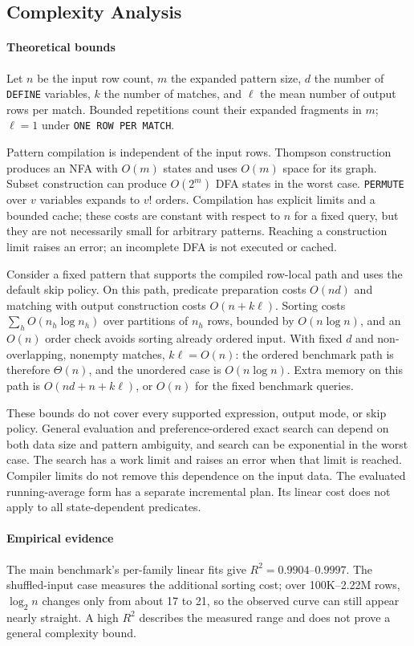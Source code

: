 \documentclass[preprint,12pt,times,a4paper]{elsarticle}
\begin{document}
\FloatBarrier
\subsection{Complexity Analysis}

\paragraph{Theoretical bounds}
Let $n$ be the input row count, $m$ the expanded pattern size, $d$ the number
of \texttt{DEFINE} variables, $k$ the number of matches, and $\ell$ the mean
number of output rows per match. Bounded repetitions count their expanded
fragments in $m$; $\ell=1$ under \texttt{ONE ROW PER MATCH}.

Pattern compilation is independent of the input rows. Thompson construction
produces an NFA with $O(m)$ states and uses $O(m)$ space for its graph.
Subset construction can produce
$O(2^m)$ DFA states in the worst case. \texttt{PERMUTE} over $v$ variables
expands to $v!$ orders. Compilation has explicit limits and a bounded cache;
these costs are constant with respect to $n$ for a fixed query, but they are
not necessarily small for arbitrary patterns. Reaching a construction limit
raises an error; an incomplete DFA is not executed or cached.

Consider a fixed pattern that supports the compiled row-local path and uses
the default skip policy. On this path,
predicate preparation costs $O(nd)$ and matching with output construction costs
$O(n+k\ell)$. Sorting costs $\sum_h O(n_h\log n_h)$ over partitions of $n_h$
rows, bounded by $O(n\log n)$, and an $O(n)$ order check avoids sorting already
ordered input. With fixed $d$ and non-overlapping, nonempty matches,
$k\ell=O(n)$: the ordered benchmark path is therefore $\Theta(n)$, and the
unordered case is $O(n\log n)$. Extra memory on this path is
$O(nd+n+k\ell)$, or $O(n)$ for the fixed benchmark queries.

These bounds do not cover every supported expression, output mode, or skip
policy. General evaluation and preference-ordered exact search can depend on
both data size and pattern ambiguity, and search can be exponential in the
worst case. The search has a work limit and raises an error when that limit is reached.
Compiler limits do not remove this dependence on the input data. The evaluated running-average form has a separate incremental plan. Its
linear cost does not apply to all state-dependent predicates.

\paragraph{Empirical evidence}
The main benchmark's per-family linear fits give $R^2=0.9904$--$0.9997$.
The shuffled-input case measures the additional sorting cost; over 100K--2.22M
rows, $\log_2 n$ changes only from about 17 to 21, so the observed curve can
still appear nearly straight. A high $R^2$ describes the measured range and
does not prove a general complexity bound.
\end{document}
